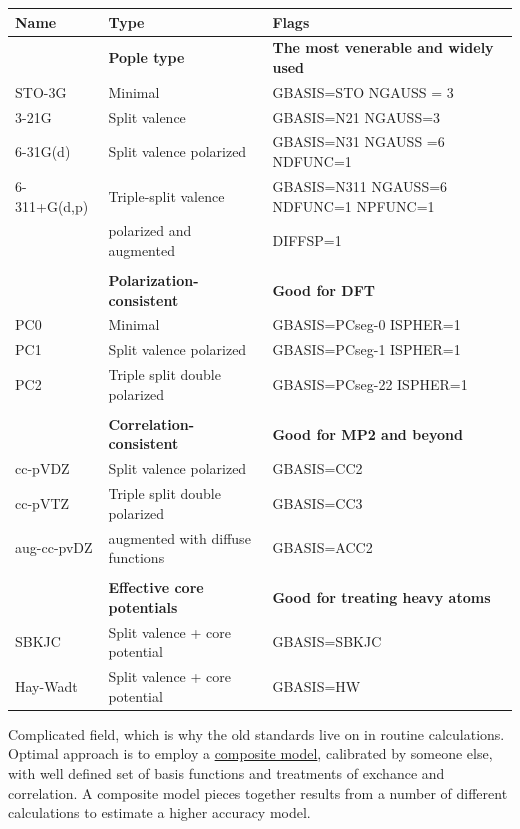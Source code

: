 \documentclass[11pt]{article}
\begin{document}
\begin{center}
\begin{tabular}{lll}
\hline
Name & Type & Flags\\
\hline
 & \textbf{Pople type} & \textbf{The most venerable and widely used}\\
STO-3G & Minimal & GBASIS=STO  NGAUSS = 3\\
3-21G & Split valence & GBASIS=N21  NGAUSS=3\\
6-31G(d) & Split valence polarized & GBASIS=N31 NGAUSS =6 NDFUNC=1\\
6-311+G(d,p) & Triple-split valence & GBASIS=N311 NGAUSS=6 NDFUNC=1 NPFUNC=1\\
 & polarized and augmented & DIFFSP=1\\
 &  & \\
 & \textbf{Polarization-consistent} & \textbf{Good for DFT}\\
PC0 & Minimal & GBASIS=PCseg-0      ISPHER=1\\
PC1 & Split valence polarized & GBASIS=PCseg-1      ISPHER=1\\
PC2 & Triple split double polarized & GBASIS=PCseg-22     ISPHER=1\\
 &  & \\
 & \textbf{Correlation-consistent} & \textbf{Good for MP2 and beyond}\\
cc-pVDZ & Split valence polarized & GBASIS=CC2\\
cc-pVTZ & Triple split double polarized & GBASIS=CC3\\
aug-cc-pvDZ & augmented with diffuse functions & GBASIS=ACC2\\
 &  & \\
 & \textbf{Effective core potentials} & \textbf{Good for treating heavy atoms}\\
SBKJC & Split valence + core potential & GBASIS=SBKJC\\
Hay-Wadt & Split valence + core potential & GBASIS=HW\\
\hline
\end{tabular}
\end{center}

Complicated field, which is why the old standards live on in routine calculations.  Optimal approach is to employ a \uline{composite model}, calibrated by someone else, with well defined set of basis functions and treatments of exchance and correlation.  A composite model pieces together results from a number of different calculations to estimate a higher accuracy model.
\end{document}
